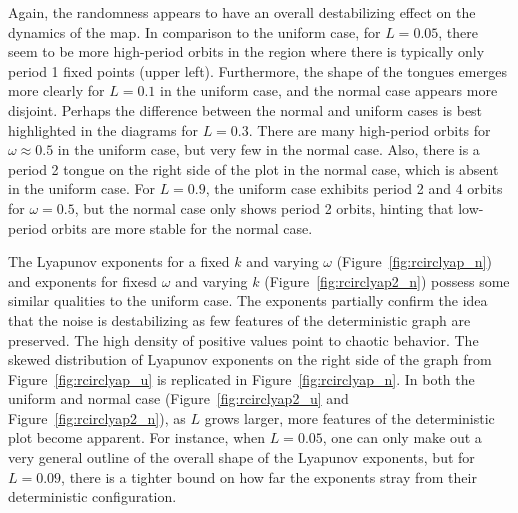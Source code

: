 Again, the randomness appears to have an overall destabilizing effect on the dynamics of the
map. In comparison to the uniform case, for $L=0.05$, there seem to be
more high-period orbits in the region where there is typically only
period 1 fixed points (upper left). Furthermore, the shape of the
tongues emerges more clearly for $L=0.1$ in the uniform case, and the
normal case appears more disjoint. Perhaps the difference between the
normal and uniform cases is best highlighted in the diagrams for
$L=0.3$. There are many high-period orbits for $\omega \approx 0.5$ in
the uniform case, but very few in the normal case. Also, there is a period
2 tongue on the right side of the plot in the normal case, which is
absent in the uniform case. For $L=0.9$, the uniform case exhibits period 2 and 4 orbits
for $\omega=0.5$, but the normal case only shows period 2 orbits, hinting that low-period orbits are more stable for the normal case. 

The Lyapunov exponents for a fixed $k$ and varying $\omega$
(Figure~\ref{fig:rcirclyap_n}) and exponents for fixesd $\omega$ and
varying $k$ (Figure~\ref{fig:rcirclyap2_n}) possess some similar
qualities to the uniform case. The exponents partially confirm the
idea that the noise is destabilizing as few features of the
deterministic graph are preserved. The high density of positive values
point to chaotic behavior. The skewed distribution of Lyapunov exponents on the right side of the graph from
Figure~\ref{fig:rcirclyap_u} is replicated in
Figure~\ref{fig:rcirclyap_n}. In both the uniform and normal case
(Figure~\ref{fig:rcirclyap2_u} and Figure~\ref{fig:rcirclyap2_n}), as $L$ grows larger, more features
of the deterministic plot become apparent. For instance, when
$L=0.05$, one can only make out a very general outline of the overall
shape of the Lyapunov exponents, but for $L=0.09$, there is a tighter
bound on how far the exponents stray from their deterministic configuration. 

